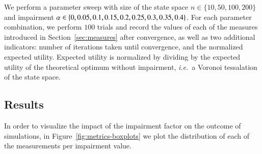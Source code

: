 We perform a parameter sweep with size of the state space $n \in \{10, 50, 100, 200\}$ and impairment $\alpha \in \{0, 0.05, 0.1, 0.15, 0.2, 0.25, 0.3, 0.35, 0.4\}$.
For each parameter combination, we perform $100$ trials and record the values of each of the measures introduced in Section~\ref{sec:measures} after convergence, as well as two additional indicators: number of iterations taken until convergence, and the normalized expected utility.
Expected utility is normalized by dividing by the expected utility of the theoretical optimum without impairment, \emph{i.e.}~a Voronoi tessalation of the state space. 

\subsection{Results}
In order to visualize the impact of the impairment factor on the outcome of simulations, in Figure~\ref{fig:metrics-boxplots} we plot the distribution of each of the measurements per impairment value.
%
